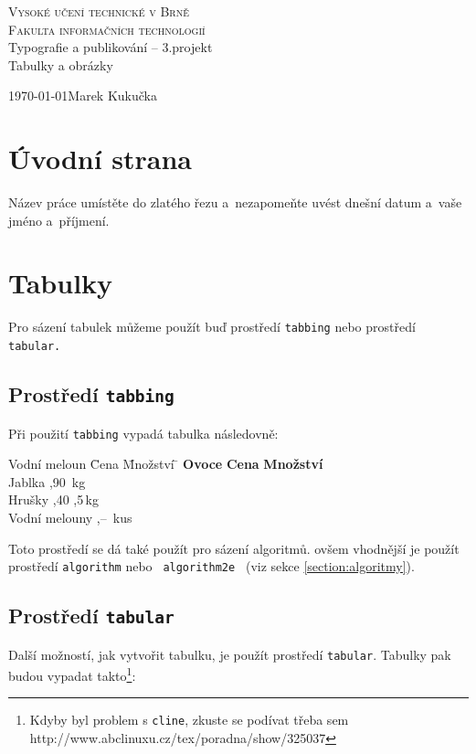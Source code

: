 \documentclass[a4paper,11pt]{article}
\begin{document}
\begin{titlepage}
\begin{center}
\Huge\textsc{Vysoké učení technické v Brně} \\
\huge\textsc{Fakulta informačních technologií} \\
\LARGE{Typografie a publikování -- 3.projekt} \\
\Huge{Tabulky a obrázky}
\end{center}
\Large\today \hfill Marek Kukučka
\end{titlepage}

\section{Úvodní strana}
Název práce umístěte do zlatého řezu a~nezapomeňte uvést dnešní datum a~vaše jméno a~příjmení.

\section{Tabulky}
Pro sázení tabulek můžeme použít buď prostředí \texttt{tabbing} nebo prostředí \texttt{tabular.}
\subsection{Prostředí \texttt{tabbing}}
Při použití \texttt{tabbing} vypadá tabulka následovně:
\begin{tabbing}
Vodní meloun \qquad\= Cena \qquad\= Množství \qquad\= \kill
\textbf{Ovoce} \> \textbf{Cena} \> \textbf{Množství} \\
Jablka ,90 \,kg \\
Hrušky ,40 ,5\,kg \\
Vodní melouny ,-- \,kus
\end{tabbing}
Toto prostředí se dá také použít pro sázení algoritmů. ovšem vhodnější je použít prostředí \texttt{algorithm} nebo \texttt{ algorithm2e } (viz sekce \ref{section:algoritmy}). 
\subsection{Prostředí \texttt{tabular}}
Další možností, jak vytvořit tabulku, je použít prostředí \texttt{tabular}. Tabulky pak budou vypadat takto\footnote{Kdyby byl problem s \texttt{cline}, zkuste se podívat třeba sem http://www.abclinuxu.cz/tex/poradna/show/325037}: 
\end{document}
